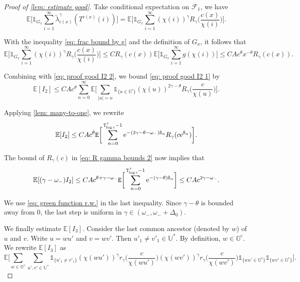 \documentclass[12pt]{article}
\numberwithin{equation}{section}
\theoremstyle{plain}
\theoremstyle{definition}
\begin{document}
\begin{proof}[Proof of \cref{lem: estimate good}]
\noindent Take conditional expectation on $\mathcal{F}_1$,  we have
\[\mathbb{E}\bigg[\mathds{1}_{G_x}\sum^{\infty}_{i=1} \tilde{\lambda}^{\gamma}_{c(x)}(T^{c(x)}(i))\bigg] = \mathbb{E}\bigg[\mathds{1}_{G_x}\sum^{\infty}_{i=1} (\chi(i))^{\gamma}R_{\gamma}\Big(\frac{c(x)}{\chi(i)}\Big)\bigg]. \]

\noindent With the inequality \eqref{eq: frac bound by g} and the definition of $G_x$, it follows that
\[\mathbb{E}\bigg[\mathds{1}_{G_x}\sum^{\infty}_{i=1} (\chi(i))^{\gamma}R_{\gamma}\Big(\frac{c(x)}{\chi(i)}\Big)\bigg]\leq CR_{\gamma}(c(x))\mathbb{E}\bigg[\mathds{1}_{G_x}\sum^{\infty}_{i=1} g(\chi(i))\bigg]\leq CAc^{\theta}x^{-\theta}R_{\gamma}(c(x)). \]

\noindent Combining with \eqref{eq: proof good I2 2}, we bound \eqref{eq: proof good I2 1} by
\[\mathbb{E}[I_2]\leq CAc^{\theta}\sum^{\infty}_{n=0}\mathbb{E}\bigg[\sum_{|u|=n}\mathds{1}_{\{u\in\mathbb{G}^c\}} (\chi(u))^{2\gamma-\theta}R_{\gamma}\Big(\frac{c}{\chi(u)}\Big)\bigg].\]

\noindent Applying \cref{lem: many-to-one}, we rewrite
\[
\mathbb{E}[I_2]\leq CAc^{\theta}{\tt E}\bigg[\sum^{{\tt T}^+_{\log c}-1}_{n=0}\mathrm{e}^{-(2\gamma-\theta-\omega_-){\hat{\tt S}}_n} R_{\gamma}(c\mathrm{e}^{{\hat{\tt S}}_n})\bigg].
\]

\noindent The bound of $R_{\gamma}(c)$ in \eqref{eq: R gamma bounds 2} now implies that
\begin{equation}\label{eq: proof good I2 final}
\mathbb{E}[(\gamma-\omega_-)I_2]\leq CAc^{\theta+\gamma-\omega_-} {\tt E}\bigg[\sum^{{\tt T}_{\log c}^+-1}_{n=0}\mathrm{e}^{-(\gamma-\theta){\hat{\tt S}}_n} \bigg]\leq CAc^{2\gamma-\omega_-}.
\end{equation}

\noindent We use \eqref{eq: green function r.w.} in the last inequality. Since $\gamma-\theta$ is bounded away from $0$, the last step is uniform in $\gamma\in(\omega_-, \omega_-+\Delta_0)$.

We finally estimate $\mathbb{E}[I_3]$. Consider the last common ancestor (denoted by $w$) of $u$ and $v$. Write $u = wu'$ and $v = wv'$. Then $u'_1\ne v'_1\in\mathbb{U}^*$. By definition, $w\in\mathbb{G}^c$. We rewrite $\mathbb{E}[I_3]$ as
\[
  \mathbb{E}\bigg[\sum_{w\in\mathbb{G}^c}\sum_{u', v'\in\mathbb{U}^*}\mathds{1}_{\{u'_1\ne v'_1\}}(\chi(wu'))^{\gamma}r_{\gamma}\Big(\frac{c}{\chi(wu')}\Big)(\chi(wv'))^{\gamma}r_{\gamma}\Big(\frac{c}{\chi(wv')}\Big)\mathds{1}_{\{wu'\in\mathbb{G}^c\}}\mathds{1}_{\{wv'\in\mathbb{G}^c\}}\bigg].
\]


\end{proof}
\end{document}
